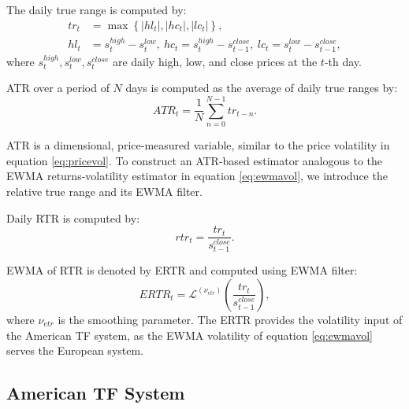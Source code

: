 \documentclass[hidelinks]{siamonline250211}
\begin{document}
\begin{definition}
	The daily true range is computed by:
	\begin{equation} \label{eq:int4} 
		\begin{split}
			tr_{t} & = \max\left\{\left|hl_{t} \right|, \left|hc_{t} \right| , \left|lc_{t} \right|  \right\}, \\
			hl_{t}& = s^{high}_{t} - s^{low}_{t}, \ hc_{t} = s^{high}_{t} - s^{close}_{t-1}, \ lc_{t} = s^{low}_{t} - s^{close}_{t-1},
		\end{split}
	\end{equation}
	where $s^{high}_{t}, s^{low}_{t}, s^{close}_{t}$ are daily high, low, and close prices at the $t$-th day.
	
	ATR over a period of $N$ days is computed as the average of daily true ranges by:
	\begin{equation} \label{eq:int5}
		ATR_{t} =  \frac{1}{N}\sum^{N-1}_{n=0} tr_{t-n}.
	\end{equation}
\end{definition}

ATR is a dimensional, price-measured variable, similar to the price volatility in equation \eqref{eq:pricevol}. To construct an ATR-based estimator analogous to the EWMA returns-volatility estimator in equation \eqref{eq:ewmavol}, we introduce the relative true range and its EWMA filter.

\begin{definition}
	Daily RTR is computed by:
	\begin{equation} \label{eq:int6} 
		rtr_{t}  = \frac{tr_{t}}{s^{close}_{t-1}}.
	\end{equation}
	
	EWMA of RTR is denoted by ERTR and computed using EWMA filter:
	\begin{equation} \label{eq:int8}
		ERTR_{t} =   \mathcal{L}^{(\nu_{etr})}\left(\frac{tr_{t}}{s^{close}_{t-1}}\right),
	\end{equation}
	where $\nu_{etr}$ is the smoothing parameter. The ERTR provides the volatility input of the American TF system, as the EWMA volatility of equation \eqref{eq:ewmavol} serves the European system.
	
\end{definition}

\subsection{American TF System}
\end{document}
